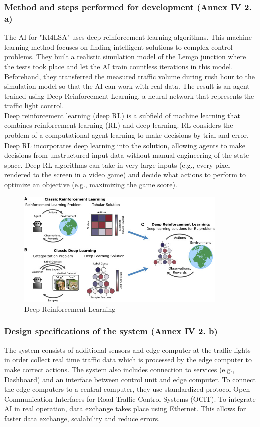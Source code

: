   \subsubsection{Method and steps performed for development (Annex IV 2. a)}
  The AI for "KI4LSA" uses deep reinforcement learning algorithms. This machine learning method focuses on finding intelligent solutions to complex control problems. They built a realistic simulation model of the Lemgo junction where the tests took place and let the AI train countless iterations in this model. Beforehand, they transferred the measured traffic volume during rush hour to the simulation model so that the AI can work with real data. The result is an agent trained using Deep Reinforcement Learning, a neural network that represents the traffic light control.\\
  Deep reinforcement learning (deep RL) is a subfield of machine learning that combines reinforcement learning (RL) and deep learning. RL considers the problem of a computational agent learning to make decisions by trial and error. Deep RL incorporates deep learning into the solution, allowing agents to make decisions from unstructured input data without manual engineering of the state space. Deep RL algorithms can take in very large inputs (e.g., every pixel rendered to the screen in a video game) and decide what actions to perform to optimize an objective (e.g., maximizing the game score).
  \begin{figure}[h]
        \includegraphics[width=0.9\textwidth]{paper-template/figs/DeepRL1.jpg}
        \caption{Deep Reinforcement Learning}
        \label{fig:my_label}
        \end{figure}
  \subsubsection{Design specifications of the system (Annex IV 2. b)}
  The system consists of additional sensors and edge computer at the traffic lights in order collect real time traffic data which is processed by the edge computer to make correct actions. The system also includes connection to services (e.g., Dashboard) and an interface between control unit and edge computer. To connect the edge computers to a central computer, they use standardized protocol Open Communication Interfaces for Road Traffic Control Systems (OCIT). To integrate AI in real operation, data exchange takes place using Ethernet. This allows for faster data exchange, scalability and reduce errors.
  
